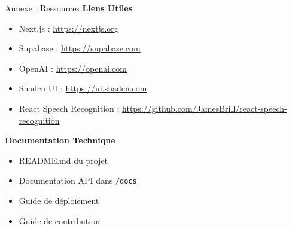 \documentclass[aspectratio=169]{beamer}
\begin{document}
\begin{frame}{Annexe : Ressources}
    \textbf{Liens Utiles}
    \begin{itemize}
        \item Next.js : \url{https://nextjs.org}
        \item Supabase : \url{https://supabase.com}
        \item OpenAI : \url{https://openai.com}
        \item Shadcn UI : \url{https://ui.shadcn.com}
        \item React Speech Recognition : \url{https://github.com/JamesBrill/react-speech-recognition}
    \end{itemize}
    
    \vspace{0.5cm}
    
    \textbf{Documentation Technique}
    \begin{itemize}
        \item README.md du projet
        \item Documentation API dans \texttt{/docs}
        \item Guide de déploiement
        \item Guide de contribution
    \end{itemize}
\end{frame}
\end{document}
